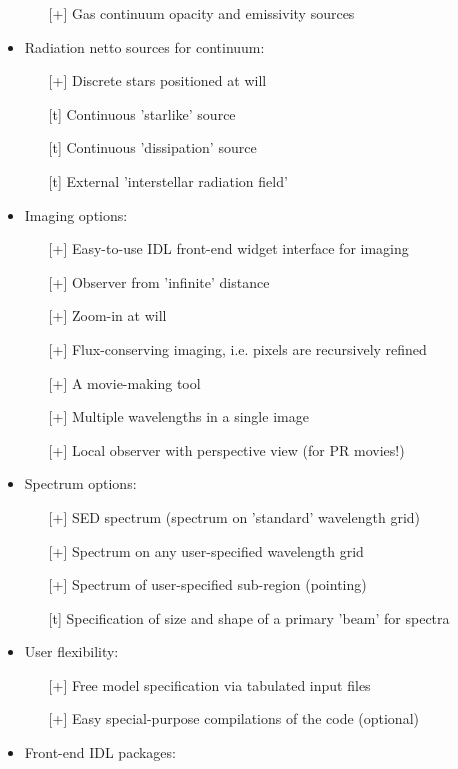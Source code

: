 \documentclass{report}
\begin{document}
\begin{itemize}
\begin{itemize}
    \item[][+] Gas continuum opacity and emissivity sources
  \end{itemize}
\item Radiation netto sources for continuum:
  \begin{itemize}
    \item[][+] Discrete stars positioned at will
    \item[][t] Continuous 'starlike' source
    \item[][t] Continuous 'dissipation' source
    \item[][t] External 'interstellar radiation field'
  \end{itemize}
\item Imaging options:
  \begin{itemize}
    \item[][+] Easy-to-use IDL front-end widget interface for imaging
    \item[][+] Observer from 'infinite' distance
    \item[][+] Zoom-in at will
    \item[][+] Flux-conserving imaging, i.e. pixels are recursively refined
    \item[][+] A movie-making tool
    \item[][+] Multiple wavelengths in a single image
    \item[][+] Local observer with perspective view (for PR movies!)
  \end{itemize}
\item Spectrum options:
  \begin{itemize}
    \item[][+] SED spectrum (spectrum on 'standard' wavelength grid)
    \item[][+] Spectrum on any user-specified wavelength grid
    \item[][+] Spectrum of user-specified sub-region (pointing)
    \item[][t] Specification of size and shape of a primary 'beam' for spectra
  \end{itemize}
\item User flexibility:
  \begin{itemize}
    \item[][+] Free model specification via tabulated input files
    \item[][+] Easy special-purpose compilations of the code (optional)
  \end{itemize}
\item Front-end IDL packages:

\end{itemize}
\end{document}
